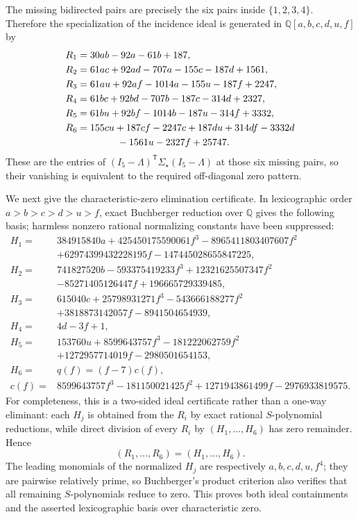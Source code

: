The missing bidirected pairs are precisely the six pairs inside \(\{1,2,3,4\}\). Therefore the specialization of the incidence ideal is generated in \(\mathbb Q[a,b,c,d,u,f]\) by
\[
\begin{aligned}
R_1={}&30ab-92a-61b+187,\\
R_2={}&61ac+92ad-707a-155c-187d+1561,\\
R_3={}&61au+92af-1014a-155u-187f+2247,\\
R_4={}&61bc+92bd-707b-187c-314d+2327,\\
R_5={}&61bu+92bf-1014b-187u-314f+3332,\\
R_6={}&155cu+187cf-2247c+187du+314df-3332d\\
&\hspace{2.8em}-1561u-2327f+25747.
\end{aligned}
\]
These are the entries of \((I_5-\Lambda)^{\mathsf T}\Sigma_\star(I_5-\Lambda)\) at those six missing pairs, so their vanishing is equivalent to the required off-diagonal zero pattern.

We next give the characteristic-zero elimination certificate. In lexicographic order
\(a>b>c>d>u>f\), exact Buchberger reduction over \(\mathbb Q\) gives the following basis; harmless nonzero rational normalizing constants have been suppressed:
\[
\begin{aligned}
H_1={}&384915840a+425450175590061f^3-8965411803407607f^2\\
&+62974399432228195f-147445028655847225,\\
H_2={}&741827520b-593375419233f^3+12321625507347f^2\\
&-85271405126447f+196665729339485,\\
H_3={}&615040c+25798931271f^3-543666188277f^2\\
&+3818873142057f-8941504654939,\\
H_4={}&4d-3f+1,\\
H_5={}&153760u+8599643757f^3-181222062759f^2\\
&+1272957714019f-2980501654153,\\
H_6={}&q(f)=(f-7)c(f),\\
c(f)={}&8599643757f^3-181150021425f^2
+1271943861499f-2976933819575.
\end{aligned}
\]
For completeness, this is a two-sided ideal certificate rather than a one-way eliminant: each \(H_j\) is obtained from the \(R_i\) by exact rational \(S\)-polynomial reductions, while direct division of every \(R_i\) by \((H_1,\ldots,H_6)\) has zero remainder. Hence
\[
(R_1,\ldots,R_6)=(H_1,\ldots,H_6).
\]
The leading monomials of the normalized \(H_j\) are respectively
\(a,b,c,d,u,f^4\); they are pairwise relatively prime, so Buchberger's product criterion also verifies that all remaining \(S\)-polynomials reduce to zero. This proves both ideal containments and the asserted lexicographic basis over characteristic zero.


